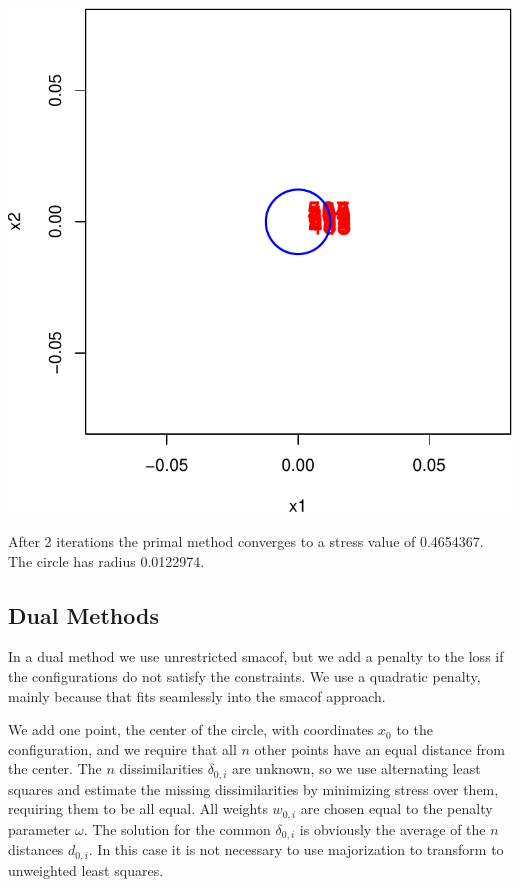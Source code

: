 \documentclass[
  12pt,
  letterpaper,
  DIV=11,
  numbers=noendperiod]{scrreprt}
\theoremstyle{remark}
\begin{document}
\begin{center}
\includegraphics{constrained_files/figure-pdf/ekcircpnts-1.pdf}
\end{center}

After 2 iterations the primal method converges to a stress value of
0.4654367. The circle has radius 0.0122974.

\subsection{Dual Methods}\label{circdual}

In a dual method we use unrestricted smacof, but we add a penalty to the
loss if the configurations do not satisfy the constraints. We use a
quadratic penalty, mainly because that fits seamlessly into the smacof
approach.

We add one point, the center of the circle, with coordinates \(x_0\) to
the configuration, and we require that all \(n\) other points have an
equal distance from the center. The \(n\) dissimilarities
\(\delta_{0,i}\) are unknown, so we use alternating least squares and
estimate the missing dissimilarities by minimizing stress over them,
requiring them to be all equal. All weights \(w_{0,i}\) are chosen equal
to the penalty parameter \(\omega\). The solution for the common
\(\delta_{0,i}\) is obviously the average of the \(n\) distances
\(d_{0,i}\). In this case it is not necessary to use majorization to
transform to unweighted least squares.
\end{document}
